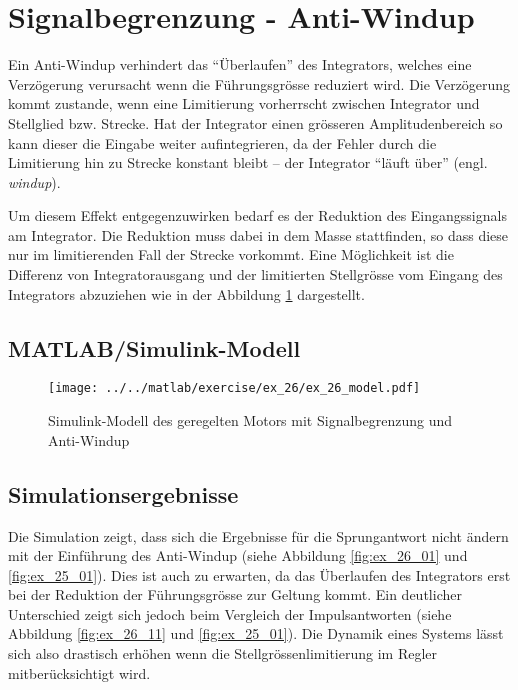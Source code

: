 \section{Signalbegrenzung - Anti-Windup}
Ein Anti-Windup verhindert das ``Überlaufen'' des Integrators, welches eine
Verzögerung verursacht wenn die Führungsgrösse reduziert wird. Die Verzögerung
kommt zustande, wenn eine Limitierung vorherrscht zwischen Integrator und
Stellglied bzw. Strecke. Hat der Integrator einen grösseren Amplitudenbereich
so kann dieser die Eingabe weiter aufintegrieren, da der Fehler durch die
Limitierung hin zu Strecke konstant bleibt -- der Integrator ``läuft über''
(engl. \emph{windup}).

Um diesem Effekt entgegenzuwirken bedarf es der Reduktion des Eingangssignals
am Integrator. Die Reduktion muss dabei in dem Masse stattfinden, so dass
diese nur im limitierenden Fall der Strecke vorkommt. Eine Möglichkeit ist die
Differenz von Integratorausgang und der limitierten Stellgrösse vom Eingang
des Integrators abzuziehen wie in der Abbildung \ref{fig:ex_26_model}
dargestellt.

\subsection{MATLAB/Simulink-Modell}

\begin{figure}[h!]
	\centering
	\texttt{[image: ../../matlab/exercise/ex\_26/ex\_26\_model.pdf]}
	\caption{Simulink-Modell des geregelten Motors mit Signalbegrenzung
		und Anti-Windup}
	\label{fig:ex_26_model}
\end{figure}

\subsection{Simulationsergebnisse}
Die Simulation zeigt, dass sich die Ergebnisse für die Sprungantwort nicht
ändern mit der Einführung des Anti-Windup (siehe Abbildung \ref{fig:ex_26_01}
und \ref{fig:ex_25_01}). Dies ist auch zu erwarten, da das Überlaufen des
Integrators erst bei der Reduktion der Führungsgrösse zur Geltung kommt. 
Ein deutlicher Unterschied zeigt sich jedoch beim Vergleich der
Impulsantworten (siehe Abbildung \ref{fig:ex_26_11} und \ref{fig:ex_25_01}).
Die Dynamik eines Systems lässt sich also drastisch erhöhen wenn die
Stellgrössenlimitierung im Regler mitberücksichtigt wird.

